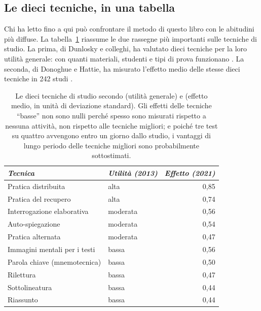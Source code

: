 \subsection*{Le dieci tecniche, in una tabella}

Chi ha letto fino a qui può confrontare il metodo di questo libro con
le abitudini più diffuse. La tabella~\ref{tab:tecniche} riassume le due
rassegne più importanti sulle tecniche di studio. La prima, di Dunlosky
e colleghi, ha valutato dieci tecniche per la loro utilità generale:
con quanti materiali, studenti e tipi di prova funzionano
\parencite{dunlosky2013}. La seconda, di Donoghue e Hattie, ha
misurato l'effetto medio delle stesse dieci tecniche in 242 studi
\parencite{donoghue2021}.

\begin{table}[tbp]
  \centering\small
  \begin{tabular}{@{}>{\raggedright\arraybackslash}p{}>{\raggedright\arraybackslash}p{}r@{}}
    \toprule
    \textit{Tecnica} & \textit{Utilità (2013)} & \textit{Effetto (2021)} \\
    \midrule
    Pratica distribuita & alta & 0,85 \\
    Pratica del recupero & alta & 0,74 \\
    Interrogazione elaborativa & moderata & 0,56 \\
    Auto-spiegazione & moderata & 0,54 \\
    Pratica alternata & moderata & 0,47 \\
    \addlinespace
    Immagini mentali per i testi & bassa & 0,56 \\
    Parola chiave (mnemotecnica) & bassa & 0,50 \\
    Rilettura & bassa & 0,47 \\
    Sottolineatura & bassa & 0,44 \\
    Riassunto & bassa & 0,44 \\
    \bottomrule
  \end{tabular}
  \caption{Le dieci tecniche di studio secondo \textcite{dunlosky2013}
    (utilità generale) e \textcite{donoghue2021} (effetto medio, in
    unità di deviazione standard). Gli effetti delle tecniche
    \enquote{basse} non sono nulli perché spesso sono misurati rispetto
    a nessuna attività, non rispetto alle tecniche migliori; e poiché
    tre test su quattro avvengono entro un giorno dallo studio, i
    vantaggi di lungo periodo delle tecniche migliori sono
    probabilmente sottostimati.}
  \label{tab:tecniche}
\end{table}

